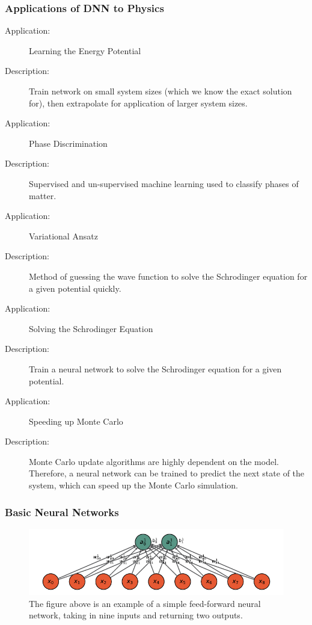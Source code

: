 \subsubsection{Applications of DNN to Physics}
\begin{description}
\item [Application:] Learning the Energy Potential
\item [Description:] Train network on small system sizes (which we know the exact solution for), then extrapolate for application of larger system sizes.

\item [Application:] Phase Discrimination
\item [Description:] Supervised and un-supervised machine learning used to classify phases of matter.

\item[Application:] Variational Ansatz 
\item[Description:] Method of guessing the wave function to solve the Schrodinger equation for a given potential quickly.

\item [Application:] Solving the Schrodinger Equation
\item[Description:] Train a neural network to solve the Schrodinger equation for a given potential.

\item [Application:] Speeding up Monte Carlo
\item [Description:] Monte Carlo update algorithms are highly dependent on the model. Therefore, a neural network can be trained to predict the next state of the system, which can speed up the Monte Carlo simulation.
\end{description}

\subsubsection{Basic Neural Networks}
\begin{figure}[H]
\centering
\includegraphics{../figures/neural_network.pdf}
\caption{The figure above is an example of a simple feed-forward neural network, taking in nine inputs and returning two outputs.}
\end{figure}


